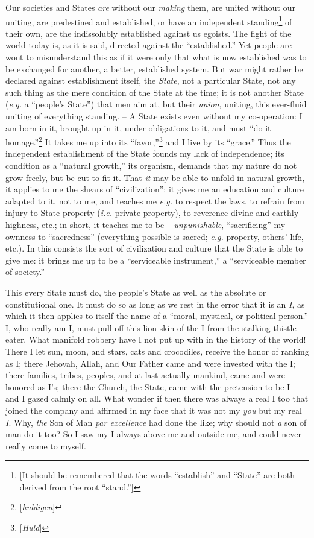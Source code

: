 Our societies and States \textit{are} without our \textit{making} them, are 
united without our uniting, are predestined and established, or have an 
independent standing\footnote{[It should be remembered that the words 
``establish'' and ``State'' are both derived from the root ``stand.'']} 
of their own, are the indissolubly established against us egoists. The fight 
of the world today is, as it is said, directed against the ``established.'' 
Yet people are wont to misunderstand this as if it were only that what is now 
established was to be exchanged for another, a better, established system. But 
war might rather be declared against establishment itself, the \textit{State}, 
not a particular State, not any such thing as the mere condition of the State 
at the time; it is not another State (\textit{e.g.} a ``people's State'') 
that men aim at, but their \textit{union}, uniting, this ever-fluid uniting of 
everything standing. -- A State exists even without my co-operation: I am born 
in it, brought up in it, under obligations to it, and must ``do it 
homage.''\footnote{[\textit{huldigen}]} It takes me up into its 
``favor,''\footnote{[\textit{Huld}]} and I live by its ``grace.'' Thus the 
independent establishment of the State founds my lack of independence; its 
condition as a ``natural growth,'' its organism, demands that my nature do 
not grow freely, but be cut to fit it. That \textit{it} may be able to unfold 
in natural growth, it applies to me the shears of ``civilization''; it gives 
me an education and culture adapted to it, not to me, and teaches me 
\textit{e.g.} to respect the laws, to refrain from injury to State property 
(\textit{i.e.} private property), to reverence divine and earthly highness, 
etc.; in short, it teaches me to be -- \textit{unpunishable}, 
``sacrificing'' my ownness to ``sacredness'' (everything possible is 
sacred; \textit{e.g.} property, others' life, etc.). In this consists the 
sort of civilization and culture that the State is able to give me: it brings 
me up to be a ``serviceable instrument,'' a ``serviceable member of 
society.''

This every State must do, the people's State as well as the absolute or 
constitutional one. It must do so as long as we rest in the error that it is 
an \textit{I}, as which it then applies to itself the name of a ``moral, 
mystical, or political person.'' I, who really am I, must pull off this 
lion-skin of the I from the stalking thistle-eater. What manifold robbery have 
I not put up with in the history of the world! There I let sun, moon, and 
stars, cats and crocodiles, receive the honor of ranking as I; there Jehovah, 
Allah, and Our Father came and were invested with the I; there families, 
tribes, peoples, and at last actually mankind, came and were honored as I's; 
there the Church, the State, came with the pretension to be I -- and I gazed 
calmly on all. What wonder if then there was always a real I too that joined 
the company and affirmed in my face that it was not my \textit{you} but my 
real \textit{I}. Why, \textit{the} Son of Man \textit{par excellence} had done 
the like; why should not \textit{a} son of man do it too? So I saw my I always 
above me and outside me, and could never really come to myself.

